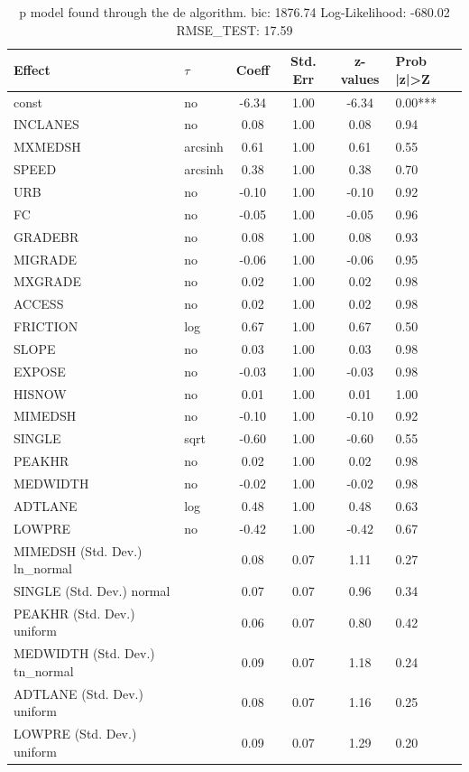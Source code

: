 \begin{table}
	\caption{p model found through the de algorithm. bic: 1876.74 Log-Likelihood: -680.02 RMSE_TEST: 17.59}
	\begin{center}
		\begin{tabular}{|l|l|c|c|c|l|}
			\hline
			Effect & $\tau$ & Coeff & Std. Err & z-values & Prob |z|>Z \\
			\hline
			const & no & -6.34 & 1.00 & -6.34 & 0.00*** \\
			\hline
			INCLANES & no & 0.08 & 1.00 & 0.08 & 0.94 \\
			\hline
			MXMEDSH & arcsinh & 0.61 & 1.00 & 0.61 & 0.55 \\
			\hline
			SPEED & arcsinh & 0.38 & 1.00 & 0.38 & 0.70 \\
			\hline
			URB & no & -0.10 & 1.00 & -0.10 & 0.92 \\
			\hline
			FC & no & -0.05 & 1.00 & -0.05 & 0.96 \\
			\hline
			GRADEBR & no & 0.08 & 1.00 & 0.08 & 0.93 \\
			\hline
			MIGRADE & no & -0.06 & 1.00 & -0.06 & 0.95 \\
			\hline
			MXGRADE & no & 0.02 & 1.00 & 0.02 & 0.98 \\
			\hline
			ACCESS & no & 0.02 & 1.00 & 0.02 & 0.98 \\
			\hline
			FRICTION & log & 0.67 & 1.00 & 0.67 & 0.50 \\
			\hline
			SLOPE & no & 0.03 & 1.00 & 0.03 & 0.98 \\
			\hline
			EXPOSE & no & -0.03 & 1.00 & -0.03 & 0.98 \\
			\hline
			HISNOW & no & 0.01 & 1.00 & 0.01 & 1.00 \\
			\hline
			MIMEDSH & no & -0.10 & 1.00 & -0.10 & 0.92 \\
			\hline
			SINGLE & sqrt & -0.60 & 1.00 & -0.60 & 0.55 \\
			\hline
			PEAKHR & no & 0.02 & 1.00 & 0.02 & 0.98 \\
			\hline
			MEDWIDTH & no & -0.02 & 1.00 & -0.02 & 0.98 \\
			\hline
			ADTLANE & log & 0.48 & 1.00 & 0.48 & 0.63 \\
			\hline
			LOWPRE & no & -0.42 & 1.00 & -0.42 & 0.67 \\
			\hline
			MIMEDSH (Std. Dev.) ln_normal &  & 0.08 & 0.07 & 1.11 & 0.27 \\
			\hline
			SINGLE (Std. Dev.) normal &  & 0.07 & 0.07 & 0.96 & 0.34 \\
			\hline
			PEAKHR (Std. Dev.) uniform &  & 0.06 & 0.07 & 0.80 & 0.42 \\
			\hline
			MEDWIDTH (Std. Dev.) tn_normal &  & 0.09 & 0.07 & 1.18 & 0.24 \\
			\hline
			ADTLANE (Std. Dev.) uniform &  & 0.08 & 0.07 & 1.16 & 0.25 \\
			\hline
			LOWPRE (Std. Dev.) uniform &  & 0.09 & 0.07 & 1.29 & 0.20 \\
			\hline
		\end{tabular}
	\end{center}
\end{table}